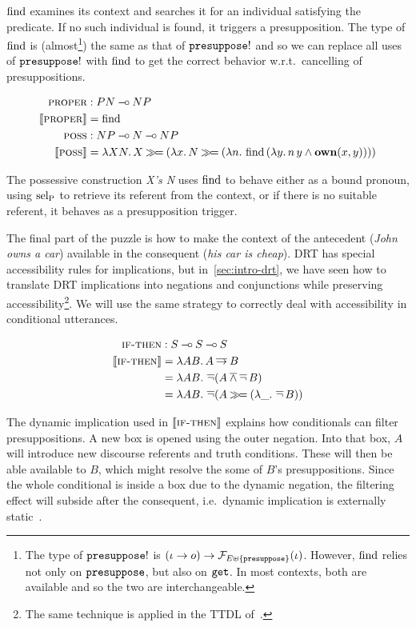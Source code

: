 $\operatorname{find}$ examines its context and searches it for an individual satisfying
the predicate. If no such individual is found, it triggers a
presupposition. The type of $\operatorname{find}$ is (almost\footnote{The type of
  $\mathtt{presuppose}!$ is
  $(\iota \to o) \to \mathcal{F}_{E \uplus \{\mathtt{presuppose}\}}(\iota)$. However,
  $\operatorname{find}$ relies not only on $\mathtt{presuppose}$, but also on $\mathtt{get}$. In
  most contexts, both are available and so the two are interchangeable.})
the same as that of $\mathtt{presuppose}!$ and so we can replace all uses of
$\mathtt{presuppose}!$ with $\operatorname{find}$ to get the correct behavior w.r.t.\
cancelling of presuppositions.

\begin{align*}
  \textsc{proper} &: PN \mathbin{{-}\mkern-3.5mu{\circ}} NP \\
  \llbracket \textsc{proper} \rrbracket &= \operatorname{find} \\
  \textsc{poss} &: NP \mathbin{{-}\mkern-3.5mu{\circ}} N \mathbin{{-}\mkern-3.5mu{\circ}} NP \\
  \llbracket \textsc{poss} \rrbracket &= \lambda X N.\, X \mathbin{\gg\!=} (\lambda x.\, N \mathbin{\gg\!=} (\lambda n.\, \operatorname{find}\,(\lambda y.\, n\,y \land \textbf{own}(x, y))))
\end{align*}

The possessive construction \emph{X's N} uses $\operatorname{find}$ to behave either as a
bound pronoun, using $\operatorname{sel_P}$ to retrieve its referent from the context, or
if there is no suitable referent, it behaves as a presupposition trigger.

The final part of the puzzle is how to make the context of the antecedent
(\emph{John owns a car}) available in the consequent (\emph{his car is
  cheap}). DRT has special accessibility rules for implications, but
in~\ref{sec:intro-drt}, we have seen how to translate DRT implications into
negations and conjunctions while preserving accessibility\footnote{The same
  technique is applied in the TTDL of~\cite{lebedeva2012expression}.}. We
will use the same strategy to correctly deal with accessibility in
conditional utterances.

\begin{align*}
  \textsc{if-then} &: S \mathbin{{-}\mkern-3.5mu{\circ}} S \mathbin{{-}\mkern-3.5mu{\circ}} S \\
  \llbracket \textsc{if-then} \rrbracket &= \lambda A B.\, A \mathbin{\overline{\to}} B \\
  &= \lambda A B.\, \mathop{\overline{\lnot}} (A \mathbin{\overline{\land}} \mathop{\overline{\lnot}} B) \\
  &= \lambda A B.\, \mathop{\overline{\lnot}} (A \mathbin{\gg\!=} (\lambda \_.\, \mathop{\overline{\lnot}} B))
\end{align*}

The dynamic implication used in $\llbracket \textsc{if-then} \rrbracket$ explains how
conditionals can filter presuppositions. A new box is opened using the
outer negation. Into that box, $A$ will introduce new discourse referents
and truth conditions. These will then be able available to $B$, which might
resolve the some of $B$'s presuppositions. Since the whole conditional is
inside a box due to the dynamic negation, the filtering effect will subside
after the consequent, i.e.\ dynamic implication is externally
static~\cite{groenendijk1991dynamic}.


